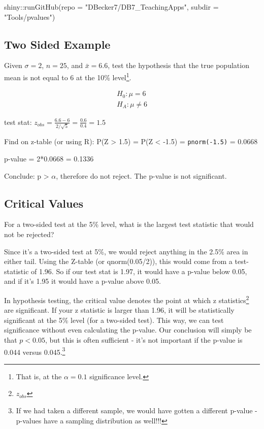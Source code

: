 \documentclass[
  letterpaper,
  DIV=11,
  numbers=noendperiod]{scrreprt}
\newenvironment{Shaded}{\begin{snugshade}}{\end{snugshade}}
\newcommand{\AttributeTok}[1]{\textcolor[rgb]{0.40,0.45,0.13}{#1}}
\newcommand{\FunctionTok}[1]{\textcolor[rgb]{0.28,0.35,0.67}{#1}}
\newcommand{\NormalTok}[1]{\textcolor[rgb]{0.00,0.23,0.31}{#1}}
\newcommand{\SpecialCharTok}[1]{\textcolor[rgb]{0.37,0.37,0.37}{#1}}
\newcommand{\StringTok}[1]{\textcolor[rgb]{0.13,0.47,0.30}{#1}}
\begin{document}
\begin{Shaded}
\begin{Highlighting}[]
\NormalTok{shiny}\SpecialCharTok{::}\FunctionTok{runGitHub}\NormalTok{(}\AttributeTok{repo =} \StringTok{"DBecker7/DB7\_TeachingApps"}\NormalTok{, }
    \AttributeTok{subdir =} \StringTok{"Tools/pvalues"}\NormalTok{)}
\end{Highlighting}
\end{Shaded}

\hypertarget{two-sided-example}{%
\subsection{Two Sided Example}\label{two-sided-example}}

Given \(\sigma = 2\), \(n = 25\), and \(\bar x = 6.6\), test the
hypothesis that the true population mean is not equal to 6 at the 10\%
level\footnote{That is, at the \(\alpha=0.1\) significance level.}.\vspace{-4mm}

\begin{align*}
H_0: \mu = 6\\
H_A: \mu \ne 6
\end{align*}

test stat:
\(z_{obs} = \frac{6.6 - 6}{2/\sqrt{5}} = \frac{0.6}{0.4} = 1.5\)

Find on z-table (or using R): P(Z \textgreater{} 1.5) = P(Z \textless{}
-1.5) = \texttt{pnorm(-1.5)} = 0.0668

p-value = 2*0.0668 = 0.1336

Conclude: p \textgreater{} \(\alpha\), therefore do not reject. The
p-value is not significant.

\hypertarget{critical-values-1}{%
\subsection{Critical Values}\label{critical-values-1}}

For a two-sided test at the 5\% level, what is the largest test
statistic that would not be rejected?

Since it's a two-sided test at 5\%, we would reject anything in the
2.5\% area in either tail. Using the Z-table (or qnorm(0.05/2)), this
would come from a test-statistic of 1.96. So if our test stat is 1.97,
it would have a p-value below 0.05, and if it's 1.95 it would have a
p-value above 0.05.

In hypothesis testing, the critical value denotes the point at which z
statistics\footnote{\(z_{obs}\)} are significant. If your z statistic is
larger than 1.96, it will be statistically significant at the 5\% level
(for a two-sided test). This way, we can test significance without even
calculating the p-value. Our conclusion will simply be that \(p<0.05\),
but this is often sufficient - it's not important if the p-value is
0.044 versus 0.045.\footnote{If we had taken a different sample, we
  would have gotten a different p-value - p-values have a sampling
  distribution as well!!!}
\end{document}

